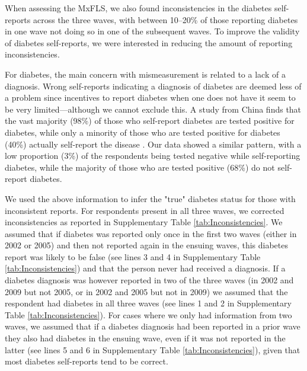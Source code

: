 \documentclass[12pt,english]{article}
\begin{document}
When assessing the \ac{MxFLS}, we also found inconsistencies in the diabetes self-reports across the three waves, with between 10--20\% of those reporting diabetes in one wave not doing so in one of the subsequent waves. To improve the validity of diabetes self-reports, we were interested in reducing the amount of reporting inconsistencies.

For diabetes, the main concern with mismeasurement is related to a lack of a diagnosis. Wrong self-reports indicating a diagnosis of diabetes are deemed less of a problem since incentives to report diabetes when one does not have it seem to be very limited---although we cannot exclude this.  A study from China finds that the vast majority (98\%) of those who self-report diabetes are tested positive for diabetes, while only a minority  of those who are tested positive for diabetes (40\%) actually self-report the disease \parencite{Yuan2015}.  Our data showed a similar pattern, with a low proportion (3\%) of the respondents being tested negative while self-reporting diabetes, while the majority of those who are tested positive (68\%) do not self-report diabetes.

We used the above information to infer the "true" diabetes status for those with inconsistent reports. For respondents present in all three waves, we corrected inconsistencies as reported in Supplementary Table \ref{tab:Inconsistencies}. We assumed that if diabetes was reported only once in the first two waves (either in 2002 or 2005) and then not reported again in the ensuing waves, this diabetes report was likely to be false (see lines 3 and 4 in Supplementary Table \ref{tab:Inconsistencies}) and that the person never had received a diagnosis. If a diabetes diagnosis was however reported in two of the three waves (in 2002 and 2009 but not 2005, or in 2002 and 2005 but not in 2009) we assumed that the respondent had diabetes in all three waves (see lines 1 and 2 in Supplementary Table \ref{tab:Inconsistencies}). For cases where we only had information from two waves, we assumed that if a diabetes diagnosis had been reported in a prior wave they also had diabetes in the ensuing wave, even if it was not reported in the latter (see lines 5 and 6 in Supplementary Table \ref{tab:Inconsistencies}), given that most diabetes self-reports tend to be correct.
\end{document}
